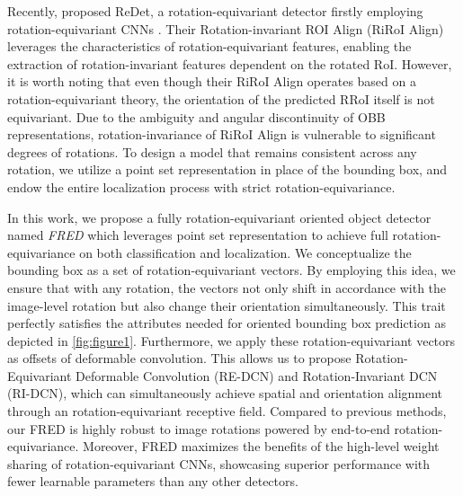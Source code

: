 \documentclass[letterpaper]{article} %
\begin{document}

Recently, \citet{han2021ReDet} proposed ReDet, a rotation-equivariant detector firstly employing rotation-equivariant CNNs \citep{weiler2019general}. Their Rotation-invariant ROI Align (RiRoI Align) leverages the characteristics of rotation-equivariant features, enabling the extraction of rotation-invariant features dependent on the rotated RoI. However, it is worth noting that even though their RiRoI Align operates based on a rotation-equivariant theory, the orientation of the predicted RRoI itself is not equivariant. Due to the ambiguity and angular discontinuity of OBB representations, rotation-invariance of RiRoI Align is vulnerable to significant degrees of rotations. To design a model that remains consistent across any rotation, we utilize a point set representation in place of the bounding box, and endow the entire localization process with strict rotation-equivariance.

In this work, we propose a fully rotation-equivariant oriented object detector named \emph{FRED} which leverages point set representation to achieve full rotation-equivariance on both classification and localization. We conceptualize the bounding box as a set of rotation-equivariant vectors. By employing this idea, we ensure that with any rotation, the vectors not only shift in accordance with the image-level rotation but also change their orientation simultaneously. This trait perfectly satisfies the attributes needed for oriented bounding box prediction as depicted in \cref{fig:figure1}. Furthermore, we apply these rotation-equivariant vectors as offsets of deformable convolution. This allows us to propose Rotation-Equivariant Deformable Convolution (RE-DCN) and Rotation-Invariant DCN (RI-DCN), which can simultaneously achieve spatial and orientation alignment through an rotation-equivariant receptive field. Compared to previous methods, our FRED is highly robust to image rotations powered by end-to-end rotation-equivariance. Moreover, FRED maximizes the benefits of the high-level weight sharing of rotation-equivariant CNNs, showcasing superior performance with fewer learnable parameters than any other detectors.
\end{document}
